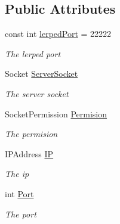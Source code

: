 \subsection*{Public Attributes}
\begin{DoxyCompactItemize}
\item 
const int \hyperlink{class_lerp2_a_p_i_1_1_communication_1_1_sockets_1_1_socket_server_a328c288869b36a51ac4c9f487d217b17}{lerped\+Port} = 22222
\begin{DoxyCompactList}\small\item\em The lerped port \end{DoxyCompactList}\item 
Socket \hyperlink{class_lerp2_a_p_i_1_1_communication_1_1_sockets_1_1_socket_server_a4b43a53f464cd78aa9656f7dacce5319}{Server\+Socket}
\begin{DoxyCompactList}\small\item\em The server socket \end{DoxyCompactList}\item 
Socket\+Permission \hyperlink{class_lerp2_a_p_i_1_1_communication_1_1_sockets_1_1_socket_server_a5671ae3a7409a4158f1aa42533f0c05a}{Permision}
\begin{DoxyCompactList}\small\item\em The permision \end{DoxyCompactList}\item 
I\+P\+Address \hyperlink{class_lerp2_a_p_i_1_1_communication_1_1_sockets_1_1_socket_server_a1d51d98aa8ca2a0d5c91611351bf65a6}{IP}
\begin{DoxyCompactList}\small\item\em The ip \end{DoxyCompactList}\item 
int \hyperlink{class_lerp2_a_p_i_1_1_communication_1_1_sockets_1_1_socket_server_aaa355d9123cd02dc8a064555989c8038}{Port}
\begin{DoxyCompactList}\small\item\em The port \end{DoxyCompactList}\end{DoxyCompactItemize}
